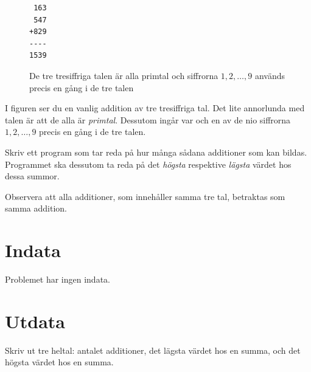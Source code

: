 
\begin{figure}
\centering
\begin{verbatim}
 163
 547
+829
----
1539
\end{verbatim}
\caption{De tre tresiffriga talen är alla primtal och siffrorna $1, 2, \dots, 9$ används precis en gång i de tre talen}
\end{figure}

I figuren ser du en vanlig addition av tre tresiffriga tal. Det lite annorlunda med talen är att de alla är \emph{primtal}. Dessutom ingår var och en 
av de nio siffrorna $1, 2, \dots, 9$ precis en gång i de tre talen.

Skriv ett program som tar reda på hur många sådana additioner som kan bildas. Programmet ska dessutom ta reda på det \emph{högsta} respektive \emph{lägsta}
värdet hos dessa summor.

Observera att alla additioner, som innehåller samma tre tal, betraktas som samma addition.

\section*{Indata}
Problemet har ingen indata.

\section*{Utdata}
Skriv ut tre heltal: antalet additioner, det lägsta värdet hos en summa, och det högsta värdet hos en summa.

